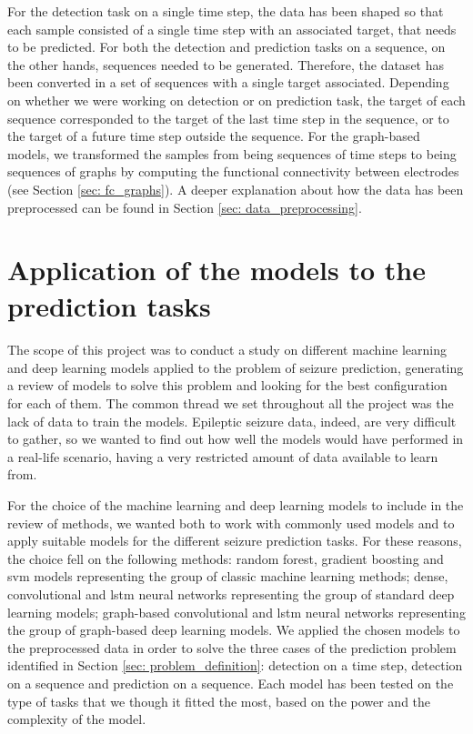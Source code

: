 For the detection task on a single time step, the data has been shaped so that each sample consisted of a single time step with an associated target, that needs to be predicted. For both the detection and prediction tasks on a sequence, on the other hands, sequences needed to be generated. Therefore, the dataset has been converted in a set of sequences with a single target associated. Depending on whether we were working on detection or on prediction task, the target of each sequence corresponded to the target of the last time step in the sequence, or to the target of a future time step outside the sequence. For the graph-based models, we transformed the samples from being sequences of time steps to being sequences of graphs by computing the functional connectivity between electrodes (see Section \ref{sec: fc_graphs}). A deeper explanation about how the data has been preprocessed can be found in Section \ref{sec: data_preprocessing}.


\section{Application of the models to the prediction tasks} \label{sec: models_application}

\paragraph{} The scope of this project was to conduct a study on different machine learning and deep learning models applied to the problem of seizure prediction, generating a review of models to solve this problem and looking for the best configuration for each of them. The common thread we set throughout all the project was the lack of data to train the models. Epileptic seizure data, indeed, are very difficult to gather, so we wanted to find out how well the models would have performed in a real-life scenario, having a very restricted amount of data available to learn from.

For the choice of the machine learning and deep learning models to include in the review of methods, we wanted both to work with commonly used models and to apply suitable models for the different seizure prediction tasks. For these reasons, the choice fell on the following methods: random forest, gradient boosting and \acs{svm} models representing the group of classic machine learning methods; dense, convolutional and \acs{lstm} neural networks representing the group of standard deep learning models; graph-based convolutional and \acs{lstm} neural networks representing the group of graph-based deep learning models. We applied the chosen models to the preprocessed data in order to solve the three cases of the prediction problem identified in Section \ref{sec: problem_definition}: detection on a time step, detection on a sequence and prediction on a sequence. Each model has been tested on the type of tasks that we though it fitted the most, based on the power and the complexity of the model.

